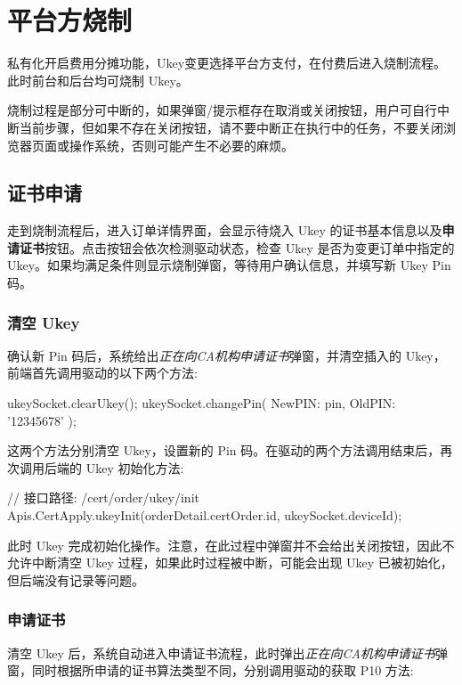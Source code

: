 \section{平台方烧制}

私有化开启费用分摊功能，Ukey变更选择平台方支付，在付费后进入烧制流程。此时前台和后台均可烧制 Ukey。

烧制过程是部分可中断的，如果弹窗/提示框存在取消或关闭按钮，用户可自行中断当前步骤，但如果不存在关闭按钮，请不要中断正在执行中的任务，不要关闭浏览器页面或操作系统，否则可能产生不必要的麻烦。

\subsection{证书申请}

走到烧制流程后，进入订单详情界面，会显示待烧入 Ukey 的证书基本信息以及\textbf{申请证书}按钮。点击按钮会依次检测驱动状态，检查 Ukey 是否为变更订单中指定的 Ukey。如果均满足条件则显示烧制弹窗，等待用户确认信息，并填写新 Ukey Pin 码。

\subsubsection{清空 Ukey}

确认新 Pin 码后，系统给出\textit{正在向CA机构申请证书}弹窗，并清空插入的 Ukey，前端首先调用驱动的以下两个方法:

\begin{JavaScript}
ukeySocket.clearUkey();
ukeySocket.changePin({ NewPIN: pin, OldPIN: '12345678' });
\end{JavaScript}

这两个方法分别清空 Ukey，设置新的 Pin 码。在驱动的两个方法调用结束后，再次调用后端的 Ukey 初始化方法:

\begin{JavaScript}
// 接口路径: /cert/order/ukey/init
Apis.CertApply.ukeyInit(orderDetail.certOrder.id, ukeySocket.deviceId);
\end{JavaScript}

此时 Ukey 完成初始化操作。注意，在此过程中弹窗并不会给出关闭按钮，因此不允许中断清空 Ukey 过程，如果此时过程被中断，可能会出现 Ukey 已被初始化，但后端没有记录等问题。

\subsubsection{申请证书}

清空 Ukey 后，系统自动进入申请证书流程，此时弹出\textit{正在向CA机构申请证书}弹窗，同时根据所申请的证书算法类型不同，分别调用驱动的获取 P10 方法:

